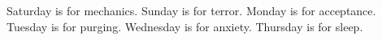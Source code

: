 Saturday is for mechanics. Sunday is for terror. Monday is for acceptance. Tuesday is for purging. Wednesday is for anxiety. Thursday is for sleep.
